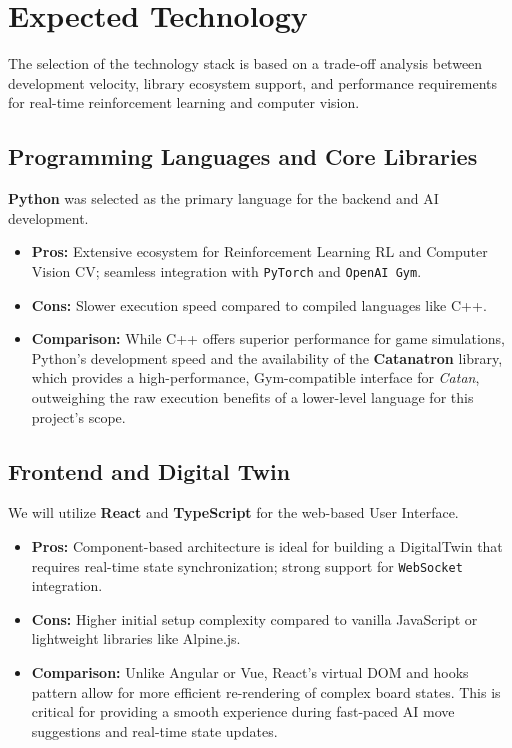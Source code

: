 \documentclass{article}
\begin{document}
\section{Expected Technology}

The selection of the \progname{} technology stack is based on a trade-off analysis between development velocity, library ecosystem support, and performance requirements for real-time reinforcement learning and computer vision.

\subsection{Programming Languages and Core Libraries}
\textbf{Python} was selected as the primary language for the backend and AI development. 

\begin{itemize}
    \item \textbf{Pros:} Extensive ecosystem for Reinforcement Learning RL and Computer Vision CV; seamless integration with \texttt{PyTorch} and \texttt{OpenAI Gym}.
    \item \textbf{Cons:} Slower execution speed compared to compiled languages like C++.
    \item \textbf{Comparison:} While C++ offers superior performance for game simulations, Python’s development speed and the availability of the \textbf{Catanatron} library, which provides a high-performance, Gym-compatible interface for \textit{Catan}, outweighing the raw execution benefits of a lower-level language for this project's scope.
\end{itemize}

\subsection{Frontend and Digital Twin}
We will utilize \textbf{React} and \textbf{TypeScript} for the web-based User Interface.

\begin{itemize}
    \item \textbf{Pros:} Component-based architecture is ideal for building a DigitalTwin that requires real-time state synchronization; strong support for \texttt{WebSocket} integration.
    \item \textbf{Cons:} Higher initial setup complexity compared to vanilla JavaScript or lightweight libraries like Alpine.js.
    \item \textbf{Comparison:} Unlike Angular or Vue, React’s virtual DOM and hooks pattern allow for more efficient re-rendering of complex board states. This is critical for providing a smooth experience during fast-paced AI move suggestions and real-time state updates.
\end{itemize}
\end{document}
